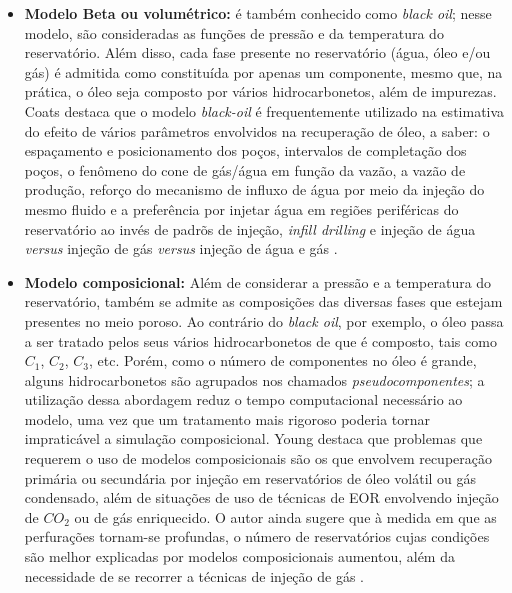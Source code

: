 \begin{itemize}
	\item \textbf{Modelo Beta ou volum\'{e}trico:} \'{e} tamb\'{e}m conhecido como \textit{black oil}; nesse modelo, s\~{a}o consideradas as fun\c{c}\~{o}es de press\~{a}o e da temperatura do reservat\'{o}rio. Al\'{e}m disso, cada fase presente no reservat\'{o}rio (\'{a}gua, \'{o}leo e/ou g\'{a}s) \'{e} admitida como constitu\'{i}da por apenas um componente, mesmo que, na pr\'{a}tica, o \'{o}leo seja composto por v\'{a}rios hidrocarbonetos, al\'{e}m de impurezas. Coats destaca que o modelo \textit{black-oil} \'{e} frequentemente utilizado na estimativa do efeito de v\'{a}rios par\^{a}metros envolvidos na recupera\c{c}\~{a}o de \'{o}leo, a saber: o espa\c{c}amento e posicionamento dos po\c{c}os, intervalos de completa\c{c}\~{a}o dos po\c{c}os, o fen\^{o}meno do cone de g\'{a}s/\'{a}gua em fun\c{c}\~{a}o da vaz\~{a}o, a vaz\~{a}o de produ\c{c}\~{a}o, refor\c{c}o do mecanismo de influxo de \'{a}gua por meio da inje\c{c}\~{a}o do mesmo fluido e a prefer\^{e}ncia por injetar \'{a}gua em regi\~{o}es perif\'{e}ricas do reservat\'{o}rio ao inv\'{e}s de padr\~{o}s de inje\c{c}\~{a}o, \textit{infill drilling} e inje\c{c}\~{a}o de \'{a}gua \textit{versus} inje\c{c}\~{a}o de g\'{a}s \textit{versus} inje\c{c}\~{a}o de \'{a}gua e g\'{a}s \cite{coats1982}. 
	\item \textbf{Modelo composicional:} Al\'{e}m de considerar a press\~{a}o e a temperatura do reservat\'{o}rio, tamb\'{e}m se admite as composi\c{c}\~{o}es das diversas fases que estejam presentes no meio poroso. Ao contr\'{a}rio do \textit{black oil}, por exemplo, o \'{o}leo passa a ser tratado pelos seus v\'{a}rios hidrocarbonetos de que \'{e} composto, tais como $C_1$, $C_2$, $C_3$, etc. Por\'{e}m, como o n\'{u}mero de componentes no \'{o}leo \'{e} grande, alguns hidrocarbonetos s\~{a}o agrupados nos chamados \textit{pseudocomponentes}; a utiliza\c{c}\~{a}o dessa abordagem reduz o tempo computacional necess\'{a}rio ao modelo, uma vez que um tratamento mais rigoroso poderia tornar impratic\'{a}vel a simula\c{c}\~{a}o composicional. Young destaca que problemas que requerem o uso de modelos composicionais s\~{a}o os que envolvem recupera\c{c}\~{a}o prim\'{a}ria ou secund\'{a}ria por inje\c{c}\~{a}o em reservat\'{o}rios de \'{o}leo vol\'{a}til ou g\'{a}s condensado, al\'{e}m de situa\c{c}\~{o}es de uso de t\'{e}cnicas de EOR envolvendo inje\c{c}\~{a}o de $CO_2$ ou de g\'{a}s enriquecido. O autor ainda sugere que \`{a} medida em que as perfura\c{c}\~{o}es tornam-se profundas, o n\'{u}mero de reservat\'{o}rios cujas condi\c{c}\~{o}es s\~{a}o melhor explicadas por modelos composicionais aumentou, al\'{e}m da necessidade de se recorrer a t\'{e}cnicas de inje\c{c}\~{a}o de g\'{a}s \cite{young1983}. 

\end{itemize}
